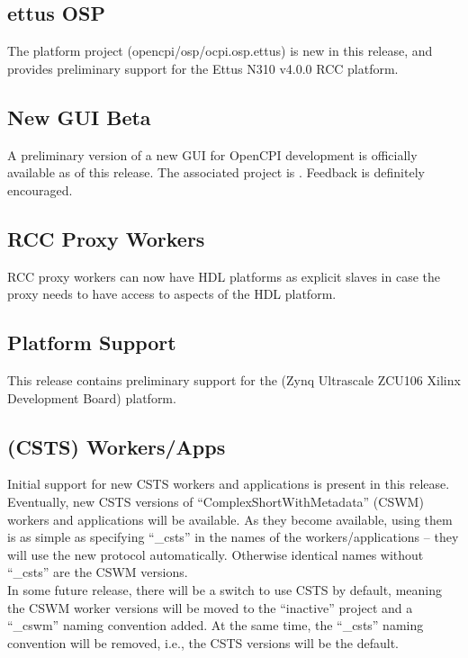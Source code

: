\subsection{ettus OSP}
\label{sec:22_ettus}
The  platform project (opencpi/osp/ocpi.osp.ettus) is new in this release, and provides preliminary support for the Ettus N310 v4.0.0 RCC platform.

\subsection{New GUI Beta}
\label{sec:22_ie_gui}
A preliminary version of a new GUI for OpenCPI development is officially available as of this release.  The associated project is .  Feedback is definitely encouraged.

\subsection{RCC Proxy Workers}
\label{sec:22_proxy_workers}
RCC proxy workers can now have HDL platforms as explicit slaves in case the proxy needs to have access to aspects of the HDL platform.

\subsection{ Platform Support}
\label{sec:22_zcu106}
This release contains preliminary support for the  (Zynq Ultrascale ZCU106 Xilinx Development Board) platform.

\subsection{ (CSTS) Workers/Apps}
\label{sec:22_csts}
Initial support for new CSTS workers and applications is present in this release.  Eventually, new CSTS versions of ``ComplexShortWithMetadata'' (CSWM) workers and applications will be available.  As they become available, using them is as simple as specifying ``\_csts'' in the names of the workers/applications -- they will use the new protocol automatically. Otherwise identical names without ``\_csts'' are the CSWM versions.\\

In some future release, there will be a switch to use CSTS by default, meaning the CSWM worker versions will be moved to the ``inactive'' project and a ``\_cswm'' naming convention added.  At the same time, the ``\_csts'' naming convention will be removed, i.e., the CSTS versions will be the default.\\

